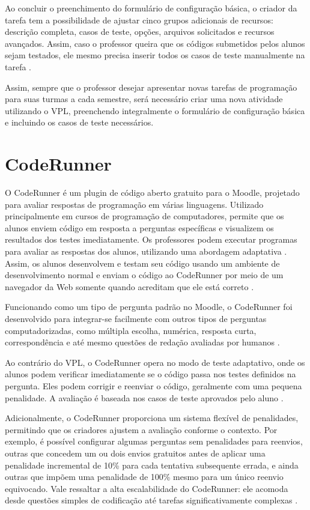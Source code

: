 Ao concluir o preenchimento do formulário de configuração básica, o criador da tarefa tem a possibilidade de ajustar cinco grupos adicionais de recursos: descrição completa, casos de teste, opções, arquivos solicitados e recursos avançados. Assim, caso o professor queira que os códigos submetidos pelos alunos sejam testados, ele mesmo precisa inserir todos os casos de teste manualmente na tarefa \cite{vpl}.

Assim, sempre que o professor desejar apresentar novas tarefas de programação para suas turmas a cada semestre, será necessário criar uma nova atividade utilizando o VPL, preenchendo integralmente o formulário de configuração básica e incluindo os casos de teste necessários.

\section{CodeRunner}

O CodeRunner é um plugin de código aberto gratuito para o Moodle, projetado para avaliar respostas de programação em várias linguagens. Utilizado principalmente em cursos de programação de computadores, permite que os alunos enviem código em resposta a perguntas específicas e visualizem os resultados dos testes imediatamente. Os professores podem executar programas para avaliar as respostas dos alunos, utilizando uma abordagem adaptativa \cite{coderunner}. Assim, os alunos desenvolvem e testam seu código usando um ambiente de desenvolvimento normal e enviam o código ao CodeRunner por meio de um navegador da Web somente quando acreditam que ele está correto \cite[p.~47]{lobbharlow}.

Funcionando como um tipo de pergunta padrão no Moodle, o CodeRunner foi desenvolvido para integrar-se facilmente com outros tipos de perguntas computadorizadas, como múltipla escolha, numérica, resposta curta, correspondência e até mesmo questões de redação avaliadas por humanos \cite[p.~48]{lobbharlow}. 

Ao contrário do VPL, o CodeRunner opera no modo de teste adaptativo, onde os alunos podem verificar imediatamente se o código passa nos testes definidos na pergunta. Eles podem corrigir e reenviar o código, geralmente com uma pequena penalidade. A avaliação é baseada nos casos de teste aprovados pelo aluno \cite{moodle}.

 Adicionalmente, o CodeRunner proporciona um sistema flexível de penalidades, permitindo que os criadores ajustem a avaliação conforme o contexto. Por exemplo, é possível configurar algumas perguntas sem penalidades para reenvios, outras que concedem um ou dois envios gratuitos antes de aplicar uma penalidade incremental de 10\% para cada tentativa subsequente errada, e ainda outras que impõem uma penalidade de 100\% mesmo para um único reenvio equivocado. Vale ressaltar a alta escalabilidade do CodeRunner: ele acomoda desde questões simples de codificação até tarefas significativamente complexas \cite[p.~48]{lobbharlow}.
 
